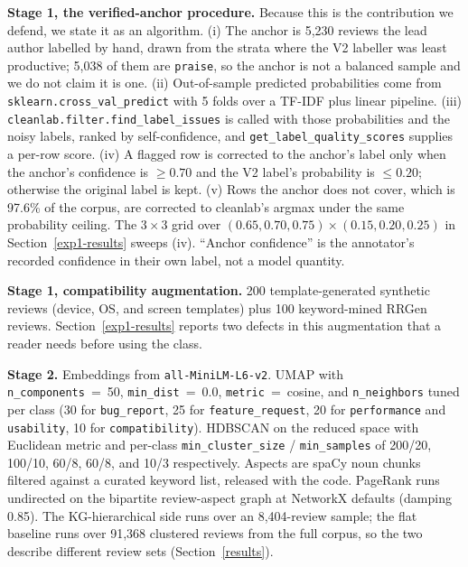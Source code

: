 \documentclass[11pt]{article}
\begin{document}
  \textbf{Stage 1, the verified-anchor procedure.} Because this is the contribution we defend, we
  state it as an algorithm. (i) The anchor is 5{,}230 reviews the lead author labelled by hand,
  drawn from the strata where the V2 labeller was least productive; 5{,}038 of them are
  \texttt{praise}, so the anchor is not a balanced sample and we do not claim it is one. (ii)
  Out-of-sample predicted probabilities come from \texttt{sklearn.cross\_val\_predict} with
  5 folds over a TF-IDF plus linear pipeline. (iii) \texttt{cleanlab.filter.find\_label\_issues}
  is called with those probabilities and the noisy labels, ranked by self-confidence, and
  \texttt{get\_label\_quality\_scores} supplies a per-row score. (iv) A flagged row is corrected to
  the anchor's label only when the anchor's confidence is $\geq 0.70$ and the V2 label's
  probability is $\leq 0.20$; otherwise the original label is kept. (v) Rows the anchor does not
  cover, which is 97.6\% of the corpus, are corrected to cleanlab's argmax under the same
  probability ceiling. The $3\times3$ grid over $(0.65, 0.70, 0.75) \times (0.15, 0.20, 0.25)$ in
  Section~\ref{exp1-results} sweeps (iv). ``Anchor confidence'' is the annotator's recorded
  confidence in their own label, not a model quantity.

  \textbf{Stage 1, compatibility augmentation.} 200 template-generated synthetic reviews (device,
  OS, and screen templates) plus 100 keyword-mined RRGen reviews. Section~\ref{exp1-results}
  reports two defects in this augmentation that a reader needs before using the class.

  \textbf{Stage 2.} Embeddings from \texttt{all-MiniLM-L6-v2}. UMAP with
  \texttt{n\_components}~=~50, \texttt{min\_dist}~=~0.0, \texttt{metric}~=~cosine, and
  \texttt{n\_neighbors} tuned per class (30 for \texttt{bug\_report}, 25 for
  \texttt{feature\_request}, 20 for \texttt{performance} and \texttt{usability}, 10 for
  \texttt{compatibility}). HDBSCAN on the reduced space with Euclidean metric and per-class
  \texttt{min\_cluster\_size} / \texttt{min\_samples} of 200/20, 100/10, 60/8, 60/8, and 10/3
  respectively. Aspects are spaCy noun chunks filtered against a curated keyword list, released
  with the code. PageRank runs undirected on the bipartite review-aspect graph at NetworkX
  defaults (damping 0.85). The KG-hierarchical side runs over an 8{,}404-review sample; the flat
  baseline runs over 91{,}368 clustered reviews from the full corpus, so the two describe
  different review sets (Section~\ref{results}).
\end{document}
